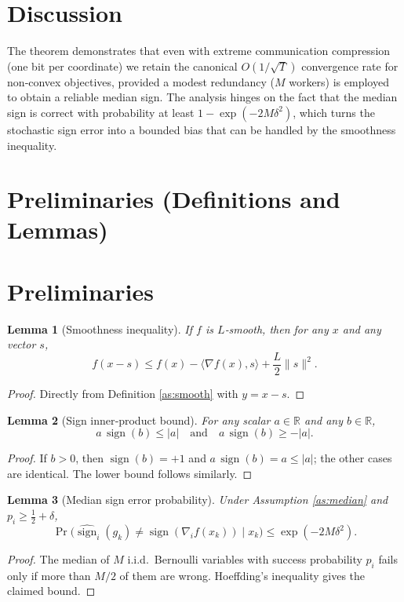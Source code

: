 \documentclass{article}
\newtheorem{lemma}{Lemma}
\newcommand{\sign}{\operatorname{sign}}
\newcommand{\R}{\mathbb{R}}
\begin{document}
\section{Discussion}
The theorem demonstrates that even with extreme
communication compression (one bit per coordinate) we retain the
canonical $O(1/\sqrt{T})$ convergence rate for non‑convex objectives,
provided a modest redundancy ($M$ workers) is employed to obtain a
reliable median sign.  The analysis hinges on the fact that the median
sign is correct with probability at least $1-\exp(-2M\delta^{2})$, which
turns the stochastic sign error into a bounded bias that can be handled
by the smoothness inequality.

\section*{Preliminaries (Definitions and Lemmas)}
\section{Preliminaries}
\begin{lemma}[Smoothness inequality]\label{lem:smooth}
If $f$ is $L$‑smooth, then for any $x$ and any vector $s$,
\[
f(x-s)\le f(x)-\langle\nabla f(x),s\rangle+\frac{L}{2}\|s\|^{2}.
\]
\end{lemma}
\begin{proof}
Directly from Definition \ref{as:smooth} with $y=x-s$.
\end{proof}

\begin{lemma}[Sign inner‑product bound]\label{lem:sign}
For any scalar $a\in\R$ and any $b\in\R$,
\[
a\,\sign(b)\le |a| \quad\text{and}\quad
a\,\sign(b)\ge -|a|.
\]
\end{lemma}
\begin{proof}
If $b>0$, then $\sign(b)=+1$ and $a\,\sign(b)=a\le|a|$; the other cases are
identical.  The lower bound follows similarly.
\end{proof}

\begin{lemma}[Median sign error probability]\label{lem:median}
Under Assumption \ref{as:median} and $p_i\ge\frac12+\delta$,
\[
\Pr\!\big(\widehat{\sign}_i(g_k)\neq\sign(\nabla_i f(x_k))\mid x_k\big)
\le \exp(-2M\delta^{2}).
\]
\end{lemma}
\begin{proof}
The median of $M$ i.i.d.\ Bernoulli variables with success probability $p_i$
fails only if more than $M/2$ of them are wrong.  Hoeffding’s inequality
gives the claimed bound.
\end{proof}
\end{document}
